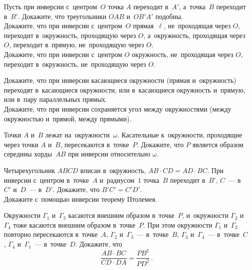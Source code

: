 


\begin{problems}

\item
\subproblem
Пусть при инверсии с~центром~$O$ точка $A$ переходит в~$A'$, а~точка~$B$
переходит в~$B'$.
Докажите, что треугольники $OAB$ и~$OB'A'$ подобны.
\\
\subproblem
Докажите, что при инверсии с~центром~$O$ прямая~$\ell$, не~проходящая
через $O$, переходит в~окружность, проходящую через $O$, а~окружность,
проходящая через $O$, переходит в~прямую, не~проходящую через $O$.
\\
\subproblem
Докажите, что при инверсии с~центром $O$ окружность, не~проходящая через $O$,
переходит в~окружность, не~проходящую через $O$.

\item
\subproblem
Докажите, что при инверсии касающиеся окружности (прямая и~окружность)
переходят в~касающиеся окружности, или в~касающиеся окружность и~прямую,
или в~пару параллельных прямых.
\\
\subproblem
Докажите, что при инверсии сохраняется угол между окружностями
(между окружностью и~прямой, между прямыми).

\item
Точки $A$ и~$B$ лежат на~окружности~$\omega$.
Касательные к~окружности, проходящие через точки $A$ и~$B$, пересекаются
в~точке~$P$.
Докажите, что $P$ является образом середины хорды~$AB$ при инверсии
относительно $\omega$.

\item
\subproblem
Четырехугольник $ABCD$ вписан в~окружность, $AB \cdot CD = AD \cdot BC$.
При инверсии с~центром в~точке~$A$ и~радиусом~$1$
точка~$B$ переходит в~$B'$,
$C$~--- в~$C'$
и~$D$~--- в~$D'$.
Докажите, что $B'C' = C'D'$.
\\
\subproblem
Докажите с~помощью инверсии теорему Птолемея.

\item
Окружности $\Gamma_{1}$ и~$\Gamma_{3}$ касаются внешним образом в~точке~$P$,
и~окружности $\Gamma_{2}$ и~$\Gamma_{4}$ тоже касаются внешним образом
в~точке~$P$.
При этом окружности
$\Gamma_{1}$ и~$\Gamma_{2}$ повторно пересекаются в~точке~$A$,
$\Gamma_{2}$ и~$\Gamma_{3}$~--- в~точке~$B$,
$\Gamma_{3}$ и~$\Gamma_{4}$~--- в~точке~$C$,
$\Gamma_{4}$ и~$\Gamma_{1}$~--- в~точке~$D$.
Докажите, что
\[
    \frac{AB \cdot BC}{CD \cdot DA} = \frac{PB^2}{PD^2}
\, . \]


\end{problems}
